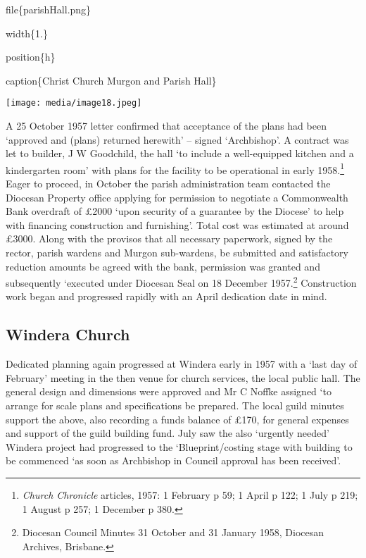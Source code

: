 file\{parishHall.png\}

width\{1.\}

position\{h\}

caption\{Christ Church Murgon and Parish Hall\}

\texttt{[image: media/image18.jpeg]}

A 25 October 1957 letter confirmed that acceptance of the plans had been
`approved and (plans) returned herewith' -- signed `Archbishop'. A
contract was let to builder, J W Goodchild, the hall `to include a
well-equipped kitchen and a kindergarten room' with plans for the
facility to be operational in early 1958.\footnote{\emph{Church
  Chronicle} articles, 1957: 1 February p 59; 1 April p 122; 1 July p
  219; 1 August p 257; 1 December p 380.} Eager to proceed, in October
the parish administration team contacted the Diocesan Property office
applying for permission to negotiate a Commonwealth Bank overdraft of
£2000 `upon security of a guarantee by the Diocese' to help with
financing construction and furnishing'. Total cost was estimated at
around £3000. Along with the provisos that all necessary paperwork,
signed by the rector, parish wardens and Murgon sub-wardens, be
submitted and satisfactory reduction amounts be agreed with the bank,
permission was granted and subsequently `executed under Diocesan Seal on
18 December 1957.\footnote{Diocesan Council Minutes 31 October and 31
  January 1958, Diocesan Archives, Brisbane.} Construction work began
and progressed rapidly with an April dedication date in mind.

\hypertarget{windera-church}{%
\subsection{Windera Church}\label{windera-church}}

Dedicated planning again progressed at Windera early in 1957 with a
`last day of February' meeting in the then venue for church services,
the local public hall. The general design and dimensions were approved
and Mr C Noffke assigned `to arrange for scale plans and specifications
be prepared. The local guild minutes support the above, also recording a
funds balance of £170, for general expenses and support of the guild
building fund. July saw the also `urgently needed' Windera project had
progressed to the `Blueprint/costing stage with building to be commenced
`as soon as Archbishop in Council approval has been received'.

